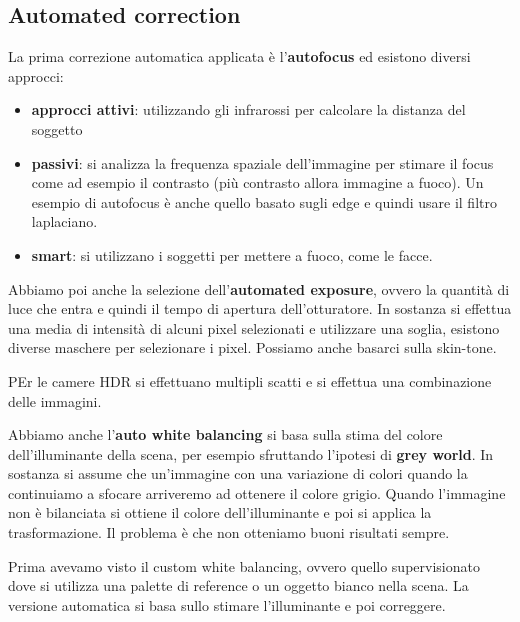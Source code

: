 \subsection{Automated correction}
La prima correzione automatica applicata è l'\textbf{autofocus} ed esistono diversi 
approcci:
\begin{itemize}
    \item \textbf{approcci attivi}: utilizzando gli infrarossi per calcolare la
    distanza del soggetto
    \item \textbf{passivi}: si analizza la frequenza spaziale dell'immagine per 
    stimare il focus come ad esempio il contrasto (più contrasto allora immagine a fuoco).
    Un esempio di autofocus è anche quello basato sugli edge e quindi usare il filtro 
    laplaciano.
    \item \textbf{smart}: si utilizzano i soggetti per mettere a fuoco, come le facce.
\end{itemize}

Abbiamo poi anche la selezione dell'\textbf{automated exposure}, ovvero la quantità 
di luce che entra e quindi il tempo di apertura dell'otturatore. In sostanza si 
effettua una media di intensità di alcuni pixel selezionati e utilizzare una soglia, esistono diverse maschere 
per selezionare i pixel. Possiamo anche basarci sulla skin-tone.

\begin{nota}
    PEr le camere HDR si effettuano multipli scatti e si effettua una combinazione
    delle immagini.
\end{nota}

Abbiamo anche l'\textbf{auto white balancing} si basa sulla stima del colore dell'illuminante 
della scena, per esempio sfruttando l'ipotesi di \textbf{grey world}. In sostanza 
si assume che un'immagine con una variazione di colori quando la continuiamo a sfocare 
arriveremo ad ottenere il colore grigio. Quando l'immagine non è bilanciata si ottiene 
il colore dell'illuminante e poi si applica la trasformazione. Il problema è che non 
otteniamo buoni risultati sempre.
\begin{nota}
    Prima avevamo visto il custom white balancing, ovvero quello supervisionato
    dove si utilizza una palette di reference o un oggetto bianco nella scena. La 
    versione automatica si basa sullo stimare l'illuminante e poi correggere.
\end{nota}